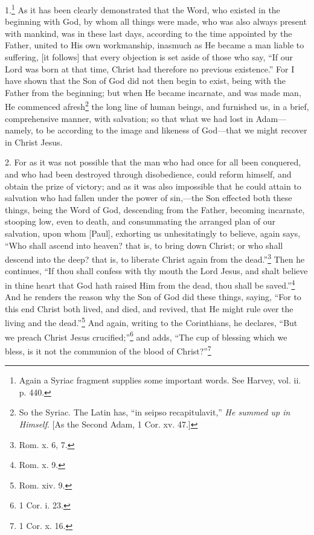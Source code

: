1.\footnote{Again a Syriac fragment supplies some important words. See Harvey, vol. ii. p. 440.} As it has been clearly demonstrated that  the Word, who existed in the beginning with God, by whom all things were made, who was also always present with mankind, was in these last days, according to the time appointed by the Father, united to His own workmanship, inasmuch as He became a man liable to suffering, [it follows] that every objection is set aside of those who say, “If our Lord was born at that time, Christ had therefore no previous existence.” For I have shown that the Son of God did not then begin to exist, being with the Father from the beginning; but when He became incarnate, and was made man, He commenced afresh\footnote{So the Syriac. The Latin has, “in seipso recapitulavit,” \emph{He summed up in Himself}. [As the Second Adam, 1 Cor. xv. 47.]} the long line of human beings, and furnished us, in a brief, comprehensive manner, with salvation; so that what we had lost in Adam—namely, to be according to the image and likeness of God—that we might recover in Christ Jesus.

2. For as it was not possible that the man who had once for all been conquered, and who had been destroyed through disobedience, could reform himself, and obtain the prize of victory; and as it was also impossible that he could attain to salvation who had fallen under the power of sin,—the Son effected both these things, being the Word of God, descending from the Father, becoming incarnate, stooping low, even to death, and consummating the arranged plan of our salvation, upon whom [Paul], exhorting us unhesitatingly to believe, again says, “Who shall ascend into heaven? that is, to bring down Christ; or who shall descend into the deep? that is, to liberate Christ again from the dead.”\footnote{Rom. x. 6, 7.} Then he continues, “If thou shall confess with thy mouth the Lord Jesus, and shalt believe in thine heart that God hath raised Him from the dead, thou shall be saved.”\footnote{Rom. x. 9.} And he renders the reason why the Son of God did these things, saying, “For to this end Christ both lived, and died, and revived, that He might rule over the living and the dead.”\footnote{Rom. xiv. 9.} And again, writing to the Corinthians, he declares, “But we preach Christ Jesus crucified;”\footnote{1 Cor. i. 23.} and adds, “The cup of blessing which we bless, is it not the communion of the blood of Christ?”\footnote{1 Cor. x. 16.}

